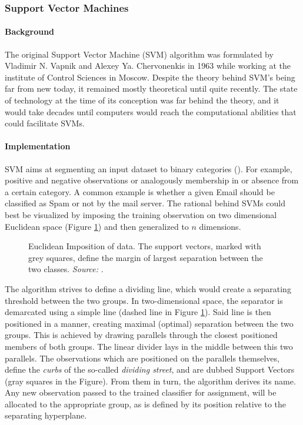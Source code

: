 \subsubsection{Support Vector Machines}
	\label{svm}
	
	\paragraph{Background}
	The original Support Vector Machine (SVM) algorithm was formulated by Vladimir N. Vapnik and Alexey Ya. Chervonenkis in 1963 while working at the institute of Control Sciences in Moscow. Despite the theory behind SVM's being far from new today, it remained mostly theoretical until quite recently. The state of technology at the time of its conception was far behind the theory, and it would take decades until computers would reach the computational abilities that could facilitate SVMs.
	
	\paragraph{Implementation}
	SVM aims at segmenting an input dataset to binary categories (\cite{SVM_burges1998tutorial}). For example, positive and negative observations or analogously membership in or absence from a certain category. A common example is whether a given Email should be classified as Spam or not by the mail server. The rational behind SVMs could best be visualized by imposing the training observation on two dimensional Euclidean space (Figure \ref{svm_euclidean_space}) and then generalized to $ n $ dimensions.
	
	\begin{figure}[h]
		\centering
		\scalebox{0.8}{
			
		}
		\captionsetup{width=0.8\textwidth}
		\caption[SVM in Euclidean Space]{
			\footnotesize{
				Euclidean Imposition of data. The support vectors, marked with grey squares, define the margin of largest separation between the two classes. \textit{Source:} \cite{SVM_cortes1995support}.
			}
		} 
		\label{svm_euclidean_space}
	\end{figure}

	 The algorithm strives to define a dividing line, which would create a separating threshold between the two groups. In two-dimensional space, the separator is demarcated using a simple line (dashed line in Figure \ref{svm_euclidean_space}). Said line is then positioned in a manner, creating maximal (optimal) separation between the two groups. This is achieved by drawing parallels through the closest positioned members of both groups. The linear divider lays in the middle between this two parallels. The observations which are positioned on the parallels themselves, define the \textit{curbs} of the so-called \textit{dividing street}, and are dubbed Support Vectors (gray squares in the Figure). From them in turn, the algorithm derives its name. Any new observation passed to the trained classifier for assignment, will be allocated to the appropriate group, as is defined by its position relative to the separating hyperplane. 
	
